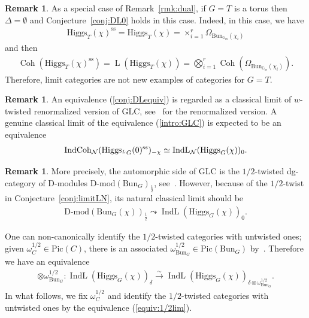 \documentclass [11pt,oneside,a4paper,mathscr]{amsart}
\theoremstyle{definition}
\newtheorem{remark}[thm]{Remark}
\newcommand{\LL}{\operatorname{L}}
\newcommand{\Coh}{\operatorname{Coh}}
\newcommand{\IndCoh}{\operatorname{IndCoh}}
\newcommand{\IndL}{\operatorname{IndL}}
\newcommand{\Hig}{\mathrm{Higgs}}
\newcommand{\Bun}{\mathrm{Bun}}
\begin{document}
\begin{remark}\label{rmk:torus}
    As a special case of Remark~\ref{rmk:dual}, if $G=T$ is a torus then $\Delta=\emptyset$ and Conjecture~\ref{conj:DL0}
    holds in this case. Indeed, in this case, we have  
\begin{align*}
    \Hig_T(\chi)^{\mathrm{ss}}=\Hig_T(\chi)=\times_{i=1}^r\Omega_{\Bun_{\mathbb{G}_m}(\chi_i)}
\end{align*}
    and then 
    \begin{align*}
        \Coh(\Hig_T(\chi)^{\mathrm{ss}})=\LL( \Hig_T(\chi))=\bigotimes_{i=1}^r
        \Coh(\Omega_{\Bun_{\mathbb{G}_m}(\chi_i)}).
    \end{align*}
    Therefore, limit categories are not new examples of categories for $G=T$. 
\end{remark}




\begin{remark}\label{rmk:limit2}
An equivalence (\ref{conj:DLequiv}) is regarded as a classical limit of $w$-twisted
renormalized version of GLC, see~\cite[Remark~1.6.9]{GLC1}
for the renormalized version. A genuine classical limit of the equivalence (\ref{intro:GLC})
is expected to be an equivalence
\begin{align}\notag
    \IndCoh_{\mathcal{N}}(\Hig_{^{L}G}(0)^{\mathrm{ss}})_{-\chi} \simeq \IndL_{\mathcal{N}}(\Hig_{G}(\chi))_0.
\end{align}
\end{remark}

\begin{remark}\label{squareroot}
More precisely, the automorphic side of GLC is 
the $1/2$-twisted dg-category of D-modules $\text{D-mod}(\Bun_G)_{\frac{1}{2}}$, 
see~\cite{GLC1}. However, because of the $1/2$-twist in Conjecture~\ref{conj:limitLN}, 
its natural classical limit should be 
\begin{align*}
\text{D-mod}(\Bun_G(\chi))_{\frac{1}{2}} \leadsto \IndL(\Hig_G(\chi))_{0}.
\end{align*}

One can non-canonically identify the $1/2$-twisted categories with untwisted ones; 
given $\omega_C^{1/2} \in \mathrm{Pic}(C)$, there is an associated $\omega_{\Bun_G}^{1/2}\in \mathrm{Pic}(\Bun_G)$ by~\cite[Section~4]{BD0}. Therefore we have an equivalence 
\begin{align}\label{equiv:1/2lim}
\otimes \omega_{\Bun_G}^{1/2} \colon 
\IndL(\Hig_{G}(\chi))_{\delta} \stackrel{\sim}{\to} \IndL(\Hig_G(\chi))_{\delta\otimes \omega_{\Bun_G}^{1/2}}.
\end{align}
In what follows, we fix $\omega_{C}^{1/2}$ and identify the $1/2$-twisted categories 
with untwisted ones by the equivalence (\ref{equiv:1/2lim}). 
\end{remark}
\end{document}
